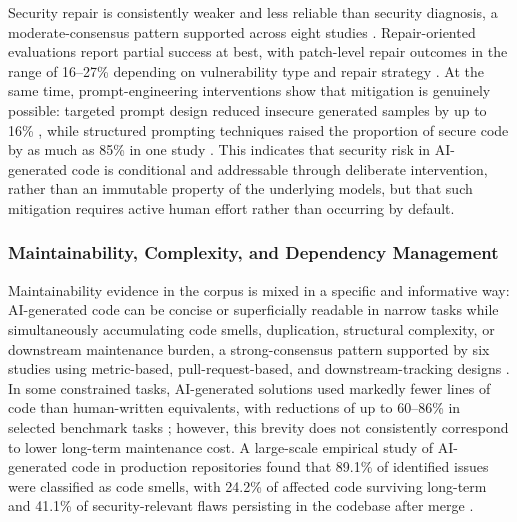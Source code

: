 Security repair is consistently weaker and less reliable than security diagnosis, a moderate-consensus pattern supported across eight studies \cite{alrashedy_can_2024,dozono_large_2026,belozerov_secure_2026,sajadi_how_2025,tony_prompting_2025,res_enhancing_2024,pearce_asleep_2025,fu_security_2025}. Repair-oriented evaluations report partial success at best, with patch-level repair outcomes in the range of 16--27\% depending on vulnerability type and repair strategy \cite{alrashedy_can_2024}. At the same time, prompt-engineering interventions show that mitigation is genuinely possible: targeted prompt design reduced insecure generated samples by up to 16\% \cite{res_enhancing_2024}, while structured prompting techniques raised the proportion of secure code by as much as 85\% in one study \cite{tony_prompting_2025}. This indicates that security risk in AI-generated code is conditional and addressable through deliberate intervention, rather than an immutable property of the underlying models, but that such mitigation requires active human effort rather than occurring by default.

\subsubsection{Maintainability, Complexity, and Dependency Management}
\label{sec:cqtd-maintainability}
Maintainability evidence in the corpus is mixed in a specific and informative way: AI-generated code can be concise or superficially readable in narrow tasks while simultaneously accumulating code smells, duplication, structural complexity, or downstream maintenance burden, a strong-consensus pattern supported by six studies using metric-based, pull-request-based, and downstream-tracking designs \cite{idrisov_program_2024,rabbi_ai_2024,borg_echoes_2026,chen_evaluating_2024,dou_whats_2026,gao_treat_2025}. In some constrained tasks, AI-generated solutions used markedly fewer lines of code than human-written equivalents, with reductions of up to 60--86\% in selected benchmark tasks \cite{idrisov_program_2024}; however, this brevity does not consistently correspond to lower long-term maintenance cost. A large-scale empirical study of AI-generated code in production repositories found that 89.1\% of identified issues were classified as code smells, with 24.2\% of affected code surviving long-term and 41.1\% of security-relevant flaws persisting in the codebase after merge \cite{liu_debt_2026}.

